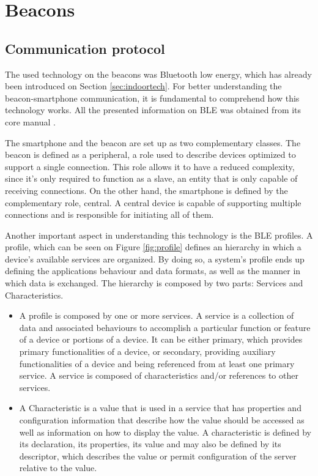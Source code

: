 \section{ Beacons}  
\label{sec:beacon}  
  
  
\subsection{Communication protocol}  
\label{sec:commprot}  
  
  
The used technology on the beacons was Bluetooth low energy, which has already been introduced on Section \ref{sec:indoortech}. For better understanding the beacon-smartphone communication, it is fundamental to comprehend how this technology works. All the presented information on \ac{BLE} was obtained from its core manual \cite{BLECore}.  
  
 
 
The smartphone and the beacon are set up as two complementary classes. The beacon is defined as a peripheral, a role used to describe devices optimized to support a single connection. This role allows it to have a reduced complexity, since it's only required to function as a slave, an entity that is only capable of receiving connections. On the other hand, the smartphone is defined by the complementary role, central. A central device is capable of supporting multiple connections and is responsible for initiating all of them.  
  
  
 
 
  
  
Another important aspect in understanding this technology is the \ac{BLE} profiles. A profile, which can be seen on Figure \ref{fig:profile} defines an hierarchy in which a device's available services are organized. By doing so, a system's profile ends up defining the applications behaviour and data formats, as well as the manner in which data is exchanged. The hierarchy is composed by two parts: Services and Characteristics.  
  
  
\begin{itemize}  
  
  
\item A profile is composed by one or more services. A service is a collection of data and associated behaviours to accomplish a particular function or feature of a device or portions of a device. It can be either primary, which provides primary functionalities of a device, or secondary, providing auxiliary functionalities of a device and being referenced from at least one primary service. A service is composed of characteristics and/or references to other services.  
  
  
\item A Characteristic is a value that is used in a service that has properties and configuration information that describe how the value should be accessed as well as information on how to display the value. A characteristic is defined by its declaration, its properties, its value and may also be defined by its descriptor, which describes the value or permit configuration of  
the server relative to the value.  
\end{itemize}  
  

